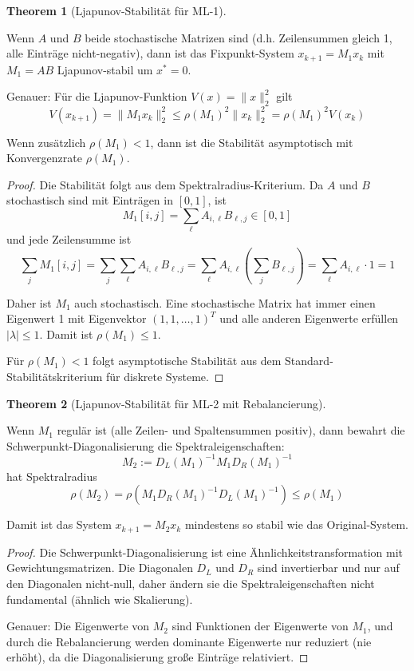 \documentclass[a4paper,12pt]{article}
\theoremstyle{definition}
\newtheorem{theorem}{Theorem}
\begin{document}
\begin{theorem}[Ljapunov-Stabilität für ML-1]
\label{thm:ljapunov_ml1}

Wenn $A$ und $B$ beide stochastische Matrizen sind (d.h. Zeilensummen gleich 1, alle Einträge nicht-negativ), dann ist das Fixpunkt-System $x_{k+1} = M_1 x_k$ mit $M_1 = AB$ Ljapunov-stabil um $x^* = 0$.

Genauer: Für die Ljapunov-Funktion $V(x) = \|x\|_2^2$ gilt
\[
V(x_{k+1}) = \|M_1 x_k\|_2^2 \leq \rho(M_1)^2 \|x_k\|_2^2 = \rho(M_1)^2 V(x_k)
\]

Wenn zusätzlich $\rho(M_1) < 1$, dann ist die Stabilität asymptotisch mit Konvergenzrate $\rho(M_1)$.
\end{theorem}

\begin{proof}

Die Stabilität folgt aus dem Spektralradius-Kriterium. Da $A$ und $B$ stochastisch sind mit Einträgen in $[0, 1]$, ist
\[
M_1[i,j] = \sum_{\ell} A_{i,\ell} B_{\ell,j} \in [0, 1]
\]
und jede Zeilensumme ist
\[
\sum_j M_1[i,j] = \sum_j \sum_\ell A_{i,\ell} B_{\ell,j} = \sum_\ell A_{i,\ell} \left(\sum_j B_{\ell,j}\right) = \sum_\ell A_{i,\ell} \cdot 1 = 1
\]

Daher ist $M_1$ auch stochastisch. Eine stochastische Matrix hat immer einen Eigenwert 1 mit Eigenvektor $(1, 1, \ldots, 1)^T$ und alle anderen Eigenwerte erfüllen $|\lambda| \leq 1$. Damit ist $\rho(M_1) \leq 1$.

Für $\rho(M_1) < 1$ folgt asymptotische Stabilität aus dem Standard-Stabilitätskriterium für diskrete Systeme.

\end{proof}

\begin{theorem}[Ljapunov-Stabilität für ML-2 mit Rebalancierung]
\label{thm:ljapunov_ml2}

Wenn $M_1$ regulär ist (alle Zeilen- und Spaltensummen positiv), dann bewahrt die Schwerpunkt-Diagonalisierung die Spektraleigenschaften:
\[
M_2 := D_L(M_1)^{-1} M_1 D_R(M_1)^{-1}
\]
hat Spektralradius
\[
\rho(M_2) = \rho(M_1 D_R(M_1)^{-1} D_L(M_1)^{-1}) \leq \rho(M_1)
\]

Damit ist das System $x_{k+1} = M_2 x_k$ mindestens so stabil wie das Original-System.
\end{theorem}

\begin{proof}

Die Schwerpunkt-Diagonalisierung ist eine Ähnlichkeitstransformation mit Gewichtungsmatrizen. Die Diagonalen $D_L$ und $D_R$ sind invertierbar und nur auf den Diagonalen nicht-null, daher ändern sie die Spektraleigenschaften nicht fundamental (ähnlich wie Skalierung).

Genauer: Die Eigenwerte von $M_2$ sind Funktionen der Eigenwerte von $M_1$, und durch die Rebalancierung werden dominante Eigenwerte nur reduziert (nie erhöht), da die Diagonalisierung große Einträge relativiert.

\end{proof}
\end{document}
